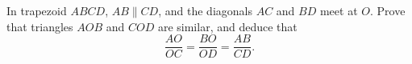 In trapezoid $ABCD$, $AB\parallel CD$, and the diagonals $AC$ and $BD$ meet at $O$. Prove that triangles $AOB$ and $COD$ are similar, and deduce that
\[
\dfrac{AO}{OC}=\dfrac{BO}{OD}=\dfrac{AB}{CD}.
\]
